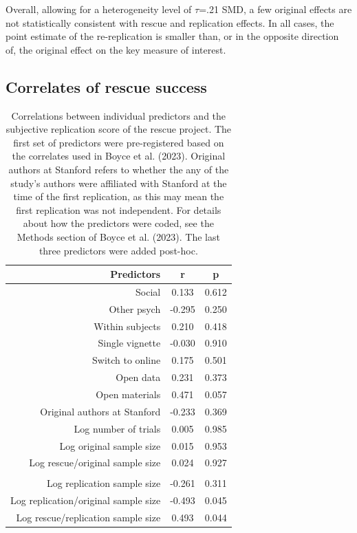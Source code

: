 \documentclass[
  english,
  a4paper,
]{article}
\begin{document}
Overall, allowing for a heterogeneity level of \(\tau\)=.21 SMD, a few original effects are not statistically consistent with rescue and replication effects.
In all cases, the point estimate of the re-replication is smaller than, or in the opposite direction of, the original effect on the key measure of interest.

\subsection{Correlates of rescue success}\label{correlates-of-rescue-success}

\begin{table}

\caption{\label{tab:cor-table}Correlations between individual predictors and the subjective replication score of the rescue project. The first set of predictors were pre-registered based on the correlates used in Boyce et al. (2023). Original authors at Stanford refers to whether the any of the study's authors were affiliated with Stanford at the time of the first replication, as this may mean the first replication was not independent. For details about how the predictors were coded, see the Methods section of Boyce et al. (2023). The last three predictors were added post-hoc.}
\centering
\begin{tabular}[t]{rcc}
\toprule
Predictors & r & p\\
\midrule
Social & 0.133 & 0.612\\
Other psych & -0.295 & 0.250\\
Within subjects & 0.210 & 0.418\\
Single vignette & -0.030 & 0.910\\
Switch to online & 0.175 & 0.501\\
Open data & 0.231 & 0.373\\
Open materials & 0.471 & 0.057\\
Original authors at Stanford & -0.233 & 0.369\\
Log number of trials & 0.005 & 0.985\\
Log original sample size & 0.015 & 0.953\\
Log rescue/original sample size & 0.024 & 0.927\\
\midrule\\
Log replication sample size & -0.261 & 0.311\\
Log replication/original sample size & -0.493 & 0.045\\
Log rescue/replication sample size & 0.493 & 0.044\\
\bottomrule
\end{tabular}
\end{table}
\end{document}
